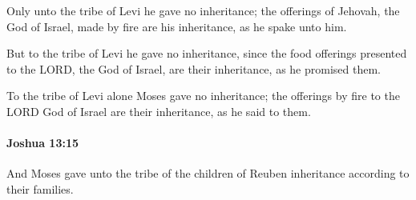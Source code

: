 			\begin{versebox}
					\item[BHS] 
					\item[ASV] Only unto the tribe of Levi he gave no inheritance; the offerings of Jehovah, the God of Israel, made by fire are his inheritance, as he spake unto him.
					\item[NIV] But to the tribe of Levi he gave no inheritance, since the food offerings presented to the LORD, the God of Israel, are their inheritance, as he promised them.
					\item[NRSV] To the tribe of Levi alone Moses gave no inheritance; the offerings by fire to the LORD God of Israel are their inheritance, as he said to them.
			\end{versebox}

		\paragraph{Joshua 13:15} %
			\label{JOSHUA-13-15}

			And Moses gave unto the tribe of the children of Reuben inheritance according to their families.

